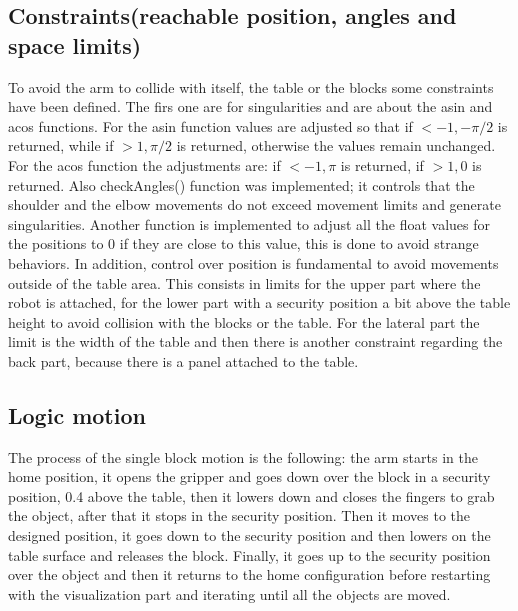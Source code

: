 \documentclass[12pt,a4paper]{article}
\begin{document}
\subsection{Constraints(reachable position, angles and space limits)}\label{subsec:constraints}
To avoid the arm to collide with itself, the table or the blocks some constraints have been defined. The firs one are for singularities and are about the asin and acos functions. For the asin function values are adjusted so that if $<-1, -\pi/2$ is returned, while if $>1, \pi/2$ is returned, otherwise the values remain unchanged. For the acos function the adjustments are: if $<-1, \pi$ is returned, if $>1, 0$ is returned. Also checkAngles() function was implemented; it controls that the shoulder and the elbow movements do not exceed movement limits and generate singularities. Another function is implemented to adjust all the float values for the positions to 0 if they are close to this value, this is done to avoid strange behaviors. In addition, control over position is fundamental to avoid movements outside of the table area. This consists in limits for the upper part where the robot is attached, for the lower part with a security position a bit above the table height to avoid collision with the blocks or the table. For the lateral part the limit is the width of the table and then there is another constraint regarding the back part, because there is a panel attached to the table.


\subsection{Logic motion}\label{subsec:logic}
The process of the single block motion is the following: the arm starts in the home position, it opens the gripper and goes down over the block in a security position, 0.4 above the table, then it lowers down and closes the fingers to grab the object, after that it stops in the security position. Then it moves to the designed position, it goes down to the security position and then lowers on the table surface and releases the block. Finally, it goes up to the security position over the object and then it returns to the home configuration before restarting with the visualization part and iterating until all the objects are moved.

\end{document}
